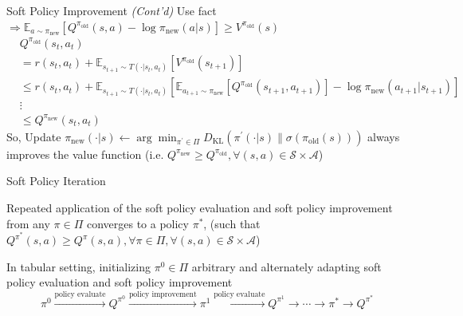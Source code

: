 \documentclass[8pt]{beamer}
\begin{document}
\begin{frame}{Soft Policy Improvement}
\textit{(Cont'd)} Use fact \(\Rightarrow \mathbb{E}_{a \sim \pi_{\text{new}}}[Q^{\pi_{\text{old}}}(s,a) - \log{\pi_{\text{new}}}(a|s)] \geq V^{\pi_{\text{old}}}(s)\)
    \[
        \begin{aligned}
            &Q^{\pi_{\text{old}}}(s_t,a_t)\\ &= r(s_t,a_t) + \mathbb{E}_{s_{t+1} \sim T(\cdot | s_t,a_t)}[V^{\pi_{\text{old}}}(s_{t+1})] \\
            &\leq r(s_t,a_t) + \mathbb{E}_{s_{t+1} \sim T(\cdot | s_t,a_t)} [\mathbb{E}_{a_{t+1} \sim \pi_{\text{new}}} [Q^{\pi_{\text{old}}}(s_{t+1}, a_{t+1})] - \log{\pi_{\text{new}}}(a_{t+1}|s_{t+1})] \\
            &\vdots \\
            &\leq Q^{\pi_{\text{new}}}(s_t, a_t)
        \end{aligned}
    \]
So, Update $\pi_{\text{new}}(\cdot|s) \leftarrow \arg \min_{\pi^\prime \in \Pi}D_{\text{KL}}(\pi^\prime (\cdot|s)\parallel \sigma(\pi_{\text{old}}(s)))$ always improves the value function (i.e. \(Q^{\pi_{\text{new}}} \geq Q^{\pi_{\text{old}}}, \forall (s,a) \in \mathcal{S} \times \mathcal{A} \))
\end{frame}

\begin{frame}{Soft Policy Iteration}
\begin{theorem}
Repeated application of the soft policy evaluation and soft policy improvement from any $\pi \in \Pi$ converges to a policy $\pi^\ast$, (such that $Q^{\pi^\ast} (s,a) \geq Q^{\pi} (s,a), \forall \pi \in \Pi, \forall (s,a) \in \mathcal{S} \times \mathcal{A}$)
\end{theorem}

In tabular setting, initializing $\pi^0 \in \Pi$ arbitrary and alternately adapting soft policy evaluation and soft policy improvement  \[\pi^0 \xrightarrow[]{\text{policy evaluate}} Q^{\pi^0} \xrightarrow[]{\text{policy improvement}} \pi^1 \xrightarrow[]{\text{policy evaluate}} Q^{\pi^1} \rightarrow \cdots \rightarrow \pi^\ast \rightarrow Q^{\pi^\ast}\]
\end{frame}
\end{document}
